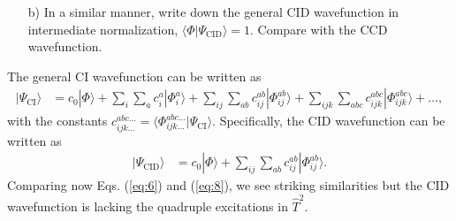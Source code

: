 \documentclass[a4paper]{article}
\begin{document}
\begin{exframe}
\begin{itemize}
  \item[b)] In a similar manner, write down the general CID wavefunction in intermediate normalization, $\langle \Phi | \Psi_\text{CID}\rangle=1$. Compare with the CCD wavefunction.
\end{itemize}
\end{exframe}
The general CI wavefunction can be written as 
\begin{align}
|\Psi_\text{CI}\rangle &= c_0 |\Phi\rangle + \sum_i \sum_a c_i^a |\Phi^a_i\rangle + \sum_{ij} \sum_{ab} c_{ij}^{ab} |\Phi^{ab}_{ij}\rangle + \sum_{ijk} \sum_{abc} c_{ijk}^{abc} |\Phi^{abc}_{ijk}\rangle + \dots,
\end{align}
with the constants $c_{ijk\dots}^{abc\dots} = \langle \Phi_{ijk\dots}^{abc\dots} |\Psi_\text{CI}\rangle$. Specifically, the CID wavefunction can be written as 
\begin{align}
|\Psi_\text{CID}\rangle &= c_0 |\Phi\rangle + \sum_{ij} \sum_{ab} c_{ij}^{ab} |\Phi^{ab}_{ij}\rangle. \label{eq:8}
\end{align}
Comparing now Eqs. (\ref{eq:6}) and (\ref{eq:8}), we see striking similarities but the CID wavefunction is lacking the quadruple excitations in $\hat T^2$.
\end{document}
